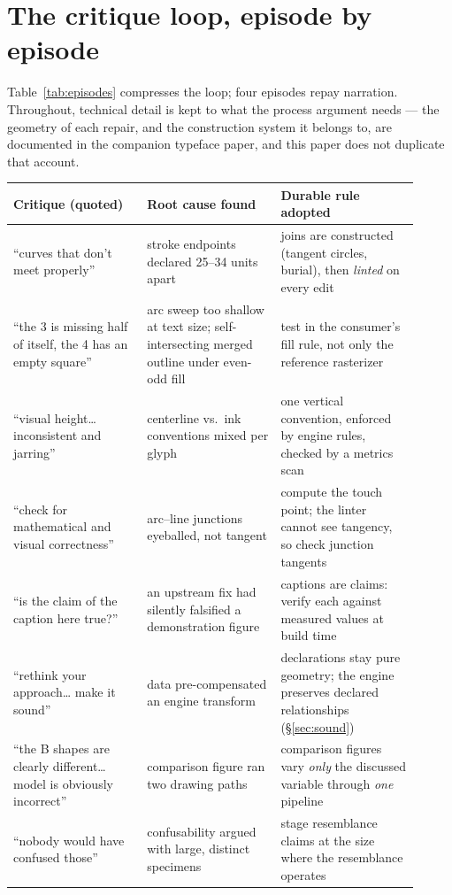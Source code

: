 \documentclass[12pt]{article}
\begin{document}
\section{The critique loop, episode by episode}\label{sec:episodes}

Table~\ref{tab:episodes} compresses the loop; four episodes repay narration. Throughout, technical detail is kept to what the process argument needs — the geometry of each repair, and the construction system it belongs to, are documented in the companion typeface paper, and this paper does not duplicate that account.

\begin{table}[t]\centering\small
\begin{tabular}{p{0.30\linewidth}p{0.30\linewidth}p{0.31\linewidth}}
\toprule
Critique (quoted) & Root cause found & Durable rule adopted \\
\midrule
``curves that don't meet properly'' & stroke endpoints declared 25--34 units apart & joins are constructed (tangent circles, burial), then \emph{linted} on every edit \\
``the 3 is missing half of itself, the 4 has an empty square'' & arc sweep too shallow at text size; self-intersecting merged outline under even-odd fill & test in the consumer's fill rule, not only the reference rasterizer \\
``visual height\ldots{} inconsistent and jarring'' & centerline vs.\ ink conventions mixed per glyph & one vertical convention, enforced by engine rules, checked by a metrics scan \\
``check for mathematical and visual correctness'' & arc--line junctions eyeballed, not tangent & compute the touch point; the linter cannot see tangency, so check junction tangents \\
``is the claim of the caption here true?'' & an upstream fix had silently falsified a demonstration figure & captions are claims: verify each against measured values at build time \\
``rethink your approach\ldots{} make it sound'' & data pre-compensated an engine transform & declarations stay pure geometry; the engine preserves declared relationships (§\ref{sec:sound}) \\
``the B shapes are clearly different\ldots{} model is obviously incorrect'' & comparison figure ran two drawing paths & comparison figures vary \emph{only} the discussed variable through \emph{one} pipeline \\
``nobody would have confused those'' & confusability argued with large, distinct specimens & stage resemblance claims at the size where the resemblance operates \\

\end{tabular}
\end{table}
\end{document}
